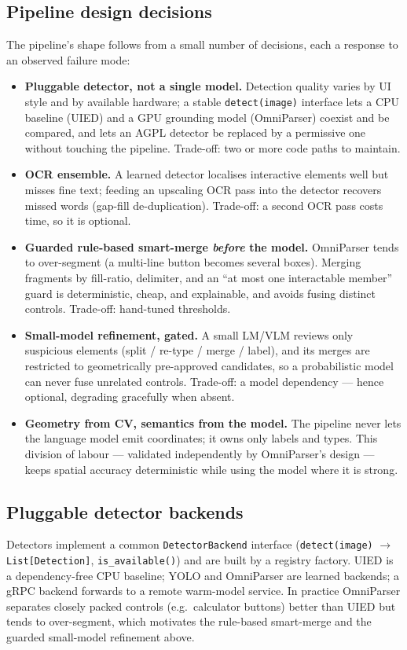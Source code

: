 \documentclass[11pt,a4paper]{article}
\newcommand{\code}[1]{\texttt{#1}}
\begin{document}
\subsection{Pipeline design decisions}
The pipeline's shape follows from a small number of decisions, each a response to an
observed failure mode:
\begin{itemize}[leftmargin=1.4em]
  \item \textbf{Pluggable detector, not a single model.} Detection quality varies by
        UI style and by available hardware; a stable \code{detect(image)} interface
        lets a CPU baseline (UIED) and a GPU grounding model (OmniParser) coexist and
        be compared, and lets an AGPL detector be replaced by a permissive one
        without touching the pipeline. Trade-off: two or more code paths to maintain.
  \item \textbf{OCR ensemble.} A learned detector localises interactive elements well
        but misses fine text; feeding an upscaling OCR pass into the detector
        recovers missed words (gap-fill de-duplication). Trade-off: a second OCR pass
        costs time, so it is optional.
  \item \textbf{Guarded rule-based smart-merge \emph{before} the model.} OmniParser
        tends to over-segment (a multi-line button becomes several boxes). Merging
        fragments by fill-ratio, delimiter, and an ``at most one interactable
        member'' guard is deterministic, cheap, and explainable, and avoids fusing
        distinct controls. Trade-off: hand-tuned thresholds.
  \item \textbf{Small-model refinement, gated.} A small LM/VLM reviews only
        suspicious elements (split / re-type / merge / label), and its merges are
        restricted to geometrically pre-approved candidates, so a probabilistic model
        can never fuse unrelated controls. Trade-off: a model dependency --- hence
        optional, degrading gracefully when absent.
  \item \textbf{Geometry from CV, semantics from the model.} The pipeline never lets
        the language model emit coordinates; it owns only labels and types. This
        division of labour --- validated independently by OmniParser's design ---
        keeps spatial accuracy deterministic while using the model where it is strong.
\end{itemize}

\subsection{Pluggable detector backends}
Detectors implement a common \code{DetectorBackend} interface
(\code{detect(image)} $\rightarrow$ \code{List[Detection]}, \code{is\_available()}) and are built by a
registry factory. UIED is a dependency-free CPU baseline; YOLO and OmniParser are
learned backends; a gRPC backend forwards to a remote warm-model service. In
practice OmniParser separates closely packed controls (e.g.\ calculator buttons)
better than UIED but tends to over-segment, which motivates the rule-based
smart-merge and the guarded small-model refinement above.
\end{document}
